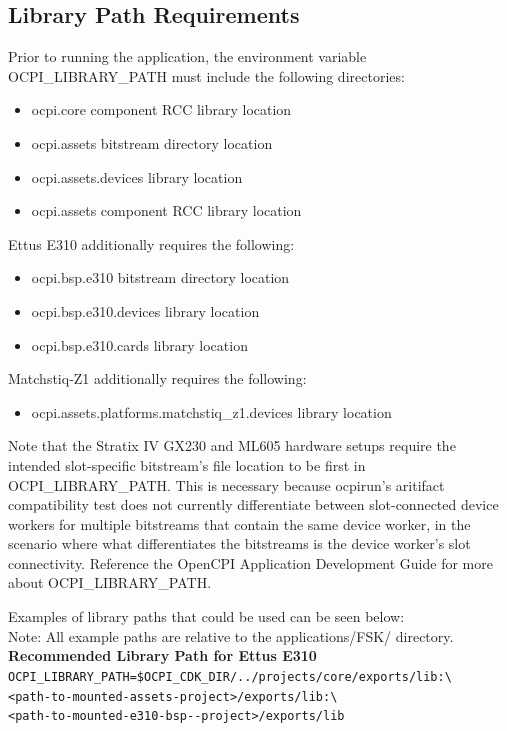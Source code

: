 \subsection{Library Path Requirements}
\noindent Prior to running the application, the environment variable OCPI\_LIBRARY\_PATH must include the following directories:\par\medskip
	\begin{itemize}
		\item ocpi.core component RCC library location
		\item ocpi.assets bitstream directory location
		\item ocpi.assets.devices library location
		\item ocpi.assets component RCC library location
	\end{itemize}
Ettus E310 additionally requires the following:
	\begin{itemize}
		\item ocpi.bsp.e310 bitstream directory location
		\item ocpi.bsp.e310.devices library location
		\item ocpi.bsp.e310.cards library location
	\end{itemize}
Matchstiq-Z1 additionally requires the following:
	\begin{itemize}
		\item ocpi.assets.platforms.matchstiq\_z1.devices library location
	\end{itemize}

\noindent Note that the Stratix IV GX230 and ML605 hardware setups require the intended slot-specific bitstream's file location to be first in OCPI\_LIBRARY\_PATH. This is necessary because ocpirun's aritifact compatibility test does not currently differentiate between slot-connected device workers for multiple bitstreams that contain the same device worker, in the scenario where what differentiates the bitstreams is the device worker's slot connectivity. Reference the OpenCPI Application Development Guide for more about OCPI\_LIBRARY\_PATH. \par\medskip

\noindent Examples of library paths that could be used can be seen below:\\

Note: All example paths are relative to the applications/FSK/ directory.\\

\noindent\textbf{Recommended Library Path for Ettus E310}\\
\verb|OCPI_LIBRARY_PATH=$OCPI_CDK_DIR/../projects/core/exports/lib:\| \\
\verb|<path-to-mounted-assets-project>/exports/lib:\| \\
\verb|<path-to-mounted-e310-bsp--project>/exports/lib| \\

